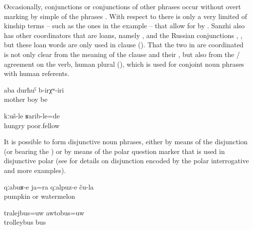 Occasionally,  conjunctions or conjunctions of other phrases occur without overt marking by simple  of the phrases . With respect to  there is only a very limited  of kinship terms – such as the ones in the example  – that allow for  by . Sanzhi also has other coordinators that are loans, namely  , and the Russian conjunctions  ,  , but these loan words are only used in clause  (). That the two  in  are coordinated is not only clear from the meaning of the clause and their , but also from the / agreement on the verb, human plural (), which is used for conjoint noun phrases with human referents.
%
\begin{exe}
	\ex	\label{ex:There were mother and son}
	\gll	aba	durħuˁ	b-irχʷ-iri\\
		mother	boy	be\\
	\glt	{}

	\ex	\label{ex:‎They were hungry and poor}
	\gll	kːuš-le	ʁarib-le=de\\
		hungry	poor.fellow\\
	\glt	{}
\end{exe}

It is possible to form disjunctive noun phrases, either by means of the disjunction  (or  bearing the )  or by means of the polar question marker   that is used in disjunctive polar  (see  for details on disjunction encoded by the polar interrogative  and more examples).
%
\begin{exe}
	\ex	\label{ex:their pumpkins or watermelons}
	\gll	qːabuʁ-e	ja=ra	qːalpuz-e	ču-la\\
		pumpkin	or	watermelon	\\
	\glt	{}

	\ex	\label{ex:‎a trolleybus or a bus}
	\gll	tralejbus=uw		awtobus=uw	\\
		trolleybus	bus\\
	\glt	{}
\end{exe}

